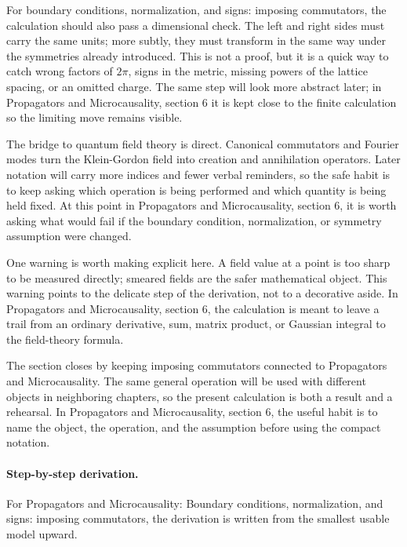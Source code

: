 For boundary conditions, normalization, and signs: imposing commutators, the calculation should also pass a dimensional check.  The left and right sides must carry the same units; more subtly, they must transform in the same way under the symmetries already introduced.  This is not a proof, but it is a quick way to catch wrong factors of \(2\pi\), signs in the metric, missing powers of the lattice spacing, or an omitted charge.  The same step will look more abstract later; in Propagators and Microcausality, section 6 it is kept close to the finite calculation so the limiting move remains visible.

The bridge to quantum field theory is direct.  Canonical commutators and Fourier modes turn the Klein-Gordon field into creation and annihilation operators.  Later notation will carry more indices and fewer verbal reminders, so the safe habit is to keep asking which operation is being performed and which quantity is being held fixed.  At this point in Propagators and Microcausality, section 6, it is worth asking what would fail if the boundary condition, normalization, or symmetry assumption were changed.

One warning is worth making explicit here.  A field value at a point is too sharp to be measured directly; smeared fields are the safer mathematical object.  This warning points to the delicate step of the derivation, not to a decorative aside.  In Propagators and Microcausality, section 6, the calculation is meant to leave a trail from an ordinary derivative, sum, matrix product, or Gaussian integral to the field-theory formula.

The section closes by keeping imposing commutators connected to Propagators and Microcausality.  The same general operation will be used with different objects in neighboring chapters, so the present calculation is both a result and a rehearsal.  In Propagators and Microcausality, section 6, the useful habit is to name the object, the operation, and the assumption before using the compact notation.



\paragraph{Step-by-step derivation.}

For Propagators and Microcausality: Boundary conditions, normalization, and signs: imposing commutators, the derivation is written from the smallest usable model upward.

